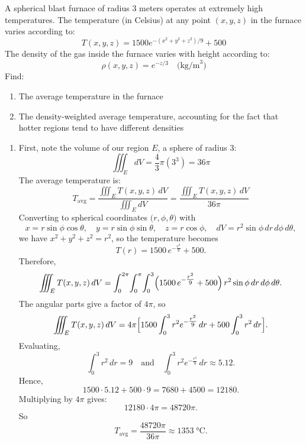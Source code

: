\exampleline
\begin{example}
A spherical blast furnace of radius 3 meters operates at extremely high temperatures. The temperature (in Celsius) at any point $(x,y,z)$ in the furnace varies according to:
\[
T(x,y,z) = 1500e^{-(x^2+y^2+z^2)/9} + 500
\]
The density of the gas inside the furnace varies with height according to:
\[
\rho(x,y,z) = e^{-z/3} \quad \text{(kg/m}^3\text{)}
\]
Find:
\begin{enumerate}
   \item The average temperature in the furnace
   \item The density-weighted average temperature, accounting for the fact that hotter regions tend to have different densities
\end{enumerate}

\begin{solution}
\begin{enumerate}
   \item First, note the volume of our region $E$, a sphere of radius 3:
   \[
   \iiint_E dV = \frac{4}{3}\pi(3^3) = 36\pi
   \]
   The average temperature is:
   \[
   T_{\mathrm{avg}} = \frac{\iiint_E T(x,y,z)\,dV}{\iiint_E dV} = \frac{\iiint_E T(x,y,z)\,dV}{36\pi}
   \]
   Converting to spherical coordinates $\bigl(r,\phi,\theta\bigr)$ with 
   \[
   x = r\sin\phi\cos\theta,\quad
   y = r\sin\phi\sin\theta,\quad
   z = r\cos\phi,\quad
   dV = r^2\sin\phi\,dr\,d\phi\,d\theta,
   \]
   we have $x^2 + y^2 + z^2 = r^2$, so the temperature becomes
   \[
   T(r) = 1500\,e^{-\tfrac{r^2}{9}} + 500.
   \]
   Therefore,
   \[
   \iiint_E T(x,y,z)\,dV 
   = \int_0^{2\pi}\!\int_0^{\pi}\!\int_0^3 \Bigl(1500\,e^{-\tfrac{r^2}{9}} + 500\Bigr)\,r^2\sin\phi\,dr\,d\phi\,d\theta.
   \]
   The angular parts give a factor of $4\pi$, so
   \[
   \iiint_E T(x,y,z)\,dV 
   = 4\pi\Bigl[
      1500\int_0^3 r^2 e^{-\tfrac{r^2}{9}}\,dr
      + 500\int_0^3 r^2\,dr
   \Bigr].
   \]
   Evaluating,
   \[
   \int_0^3 r^2\,dr = 9
   \quad\text{and}\quad
   \int_0^3 r^2 e^{-\tfrac{r^2}{9}}\,dr \approx 5.12.
   \]
   Hence,
   \[
   1500 \cdot 5.12 + 500 \cdot 9
   = 7680 + 4500
   = 12180.
   \]
   Multiplying by $4\pi$ gives:
   \[
   12180 \cdot 4\pi = 48720\pi.
   \]
   So
   \[
   T_{\mathrm{avg}} 
   = \frac{48720\pi}{36\pi} 
   \approx 1353\;\text{°C}.
   \]


\end{enumerate}
\end{solution}
\end{example}
